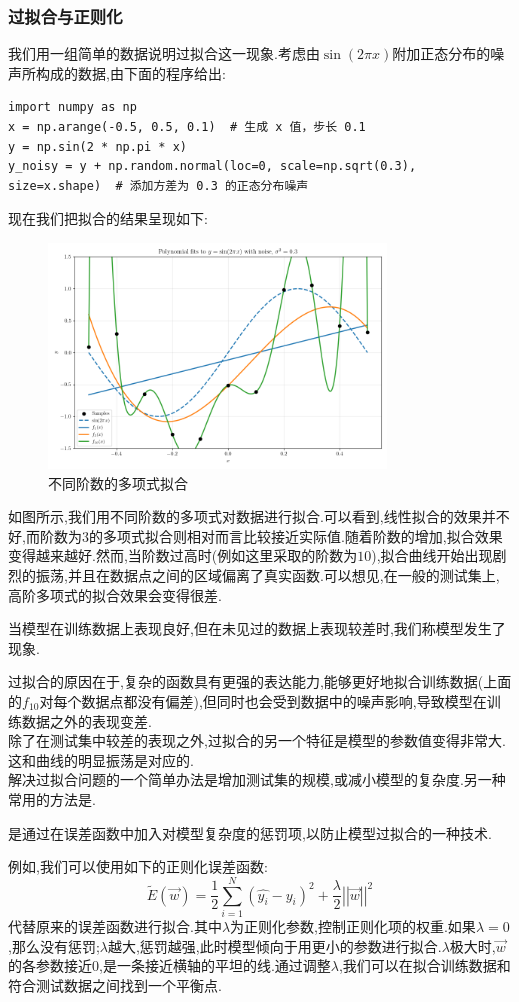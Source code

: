 \documentclass{ctexart}
\begin{document}
\subsubsection{过拟合与正则化}
我们用一组简单的数据说明过拟合这一现象.考虑由$\sin(2\pi x)$附加正态分布的噪声所构成的数据,由下面的程序给出:
\begin{lstlisting}
import numpy as np
x = np.arange(-0.5, 0.5, 0.1)  # 生成 x 值，步长 0.1
y = np.sin(2 * np.pi * x)
y_noisy = y + np.random.normal(loc=0, scale=np.sqrt(0.3), size=x.shape)  # 添加方差为 0.3 的正态分布噪声
\end{lstlisting}
现在我们把拟合的结果呈现如下:
\begin{figure}[H]
    \centering
    \includegraphics[width=0.8\textwidth]{figure/overfitting.png}
    \caption{不同阶数的多项式拟合}
\end{figure}
如图所示,我们用不同阶数的多项式对数据进行拟合.可以看到,线性拟合的效果并不好,而阶数为$3$的多项式拟合则相对而言比较接近实际值.随着阶数的增加,拟合效果变得越来越好.然而,当阶数过高时(例如这里采取的阶数为$10$),拟合曲线开始出现剧烈的振荡,并且在数据点之间的区域偏离了真实函数.可以想见,在一般的测试集上,高阶多项式的拟合效果会变得很差.
\begin{definition}[过拟合]
    当模型在训练数据上表现良好,但在未见过的数据上表现较差时,我们称模型发生了现象.
\end{definition}
\indent 过拟合的原因在于,复杂的函数具有更强的表达能力,能够更好地拟合训练数据(上面的$f_{10}$对每个数据点都没有偏差),但同时也会受到数据中的噪声影响,导致模型在训练数据之外的表现变差.\\
\indent 除了在测试集中较差的表现之外,过拟合的另一个特征是模型的参数值变得非常大.这和曲线的明显振荡是对应的.\\
\indent 解决过拟合问题的一个简单办法是增加测试集的规模,或减小模型的复杂度.另一种常用的方法是.
\begin{definition}[正则化]
    是通过在误差函数中加入对模型复杂度的惩罚项,以防止模型过拟合的一种技术.
\end{definition}
例如,我们可以使用如下的正则化误差函数:
\[\tilde{E}(\vec{w})=\dfrac12\sum_{i=1}^{N}\left(\hat{y_i}-y_i\right)^2+\dfrac{\lambda}{2}\left|\left|\vec{w}\right|\right|^2\]
代替原来的误差函数进行拟合.其中$\lambda$为正则化参数,控制正则化项的权重.如果$\lambda=0$,那么没有惩罚;$\lambda$越大,惩罚越强,此时模型倾向于用更小的参数进行拟合.$\lambda$极大时,$\vec{w}$的各参数接近$0$,是一条接近横轴的平坦的线.通过调整$\lambda$,我们可以在拟合训练数据和符合测试数据之间找到一个平衡点.
\end{document}
